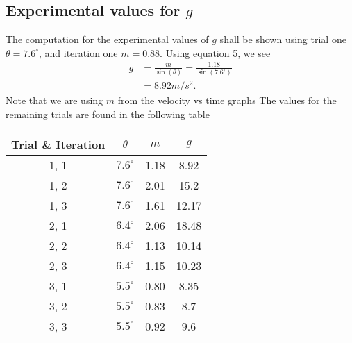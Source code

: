 \documentclass{report}
\begin{document}
    \bigbreak \noindent 
    \subsection{Experimental values for $g$}
    \bigbreak \noindent 
    The computation for the experimental values of $g$ shall be shown using trial one $\theta =7.6^{\circ}$, and iteration one $m=0.88$. Using equation 5, we see
    \begin{align*}
        g &= \frac{m}{\sin{\left(\theta\right)}} = \frac{1.18}{\sin{\left(7.6^{\circ}\right)}} \\
         &=8.92 m/s^{2}
    .\end{align*}
    Note that we are using $m$ from the velocity vs time graphs
    \bigbreak \noindent 
    The values for the remaining trials are found in the following table
    \pagebreak \bigbreak \noindent 
    \begin{center}
        \begin{tabular}{c|c|c|c}
            Trial \& Iteration & $\theta$ & $m$ & $g$\\
            \hline
            1, 1 & $7.6^{\circ}$ & 1.18 & 8.92\\
            1, 2 & $7.6^{\circ}$ & 2.01 & 15.2\\
            1, 3 & $7.6^{\circ}$ & 1.61 & 12.17 \\
            2, 1 & $6.4^{\circ}$ & 2.06 & 18.48 \\
            2, 2  & $6.4^{\circ}$ & 1.13 & 10.14\\
            2, 3 & $6.4^{\circ}$ & 1.15 & 10.23\\
            3, 1 & $5.5^{\circ}$ & 0.80 & 8.35\\
            3, 2 & $5.5^{\circ}$ & 0.83 & 8.7\\
            3, 3 & $5.5^{\circ}$ & 0.92  &9.6
        \end{tabular}
    \end{center}

    \bigbreak \noindent 
\end{document}
